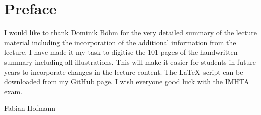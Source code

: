 \section*{Preface}
I would like to thank Dominik Böhm for the very detailed summary of the lecture material including the incorporation of the additional information from the lecture.
I have made it my task to digitise the 101 pages of the handwritten summary including all illustrations.
This will make it easier for students in future years to incorporate changes in the lecture content.
The \LaTeX~script can be downloaded from my GitHub page.
I wish everyone good luck with the IMHTA exam.

\vspace{0.5cm}

Fabian Hofmann

\newpage

\tableofcontents

\newpage


\printbibliography

%


